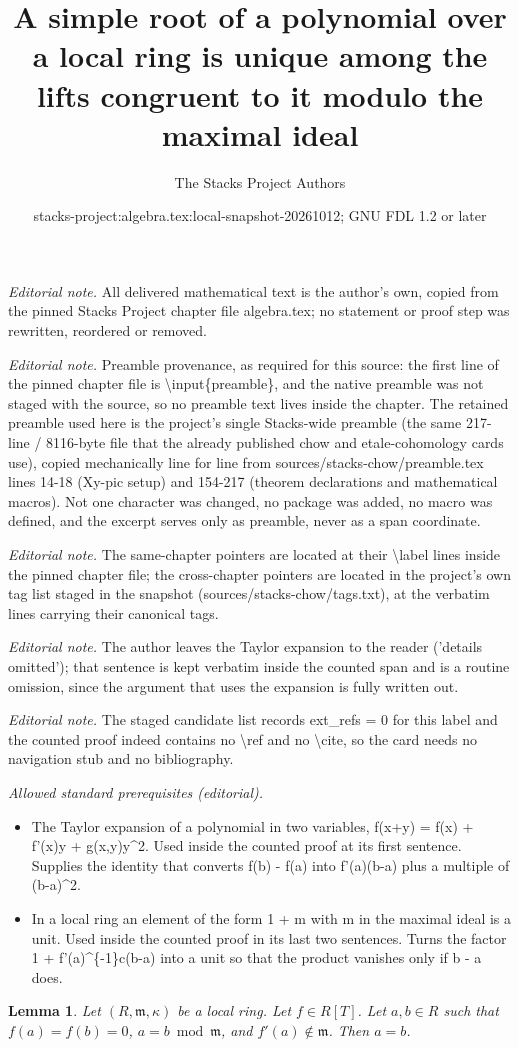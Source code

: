 \documentclass[10pt,a4paper]{amsart}
\title{A simple root of a polynomial over a local ring is unique among the lifts congruent to it modulo the maximal ideal}
\author{The Stacks Project Authors}
\date{stacks-project:algebra.tex:local-snapshot-20261012; GNU FDL 1.2 or later}
\theoremstyle{plain}
\newtheorem{lemma}[subsection]{Lemma}
\theoremstyle{definition}
\theoremstyle{remark}
\numberwithin{equation}{subsection}
\begin{document}
\maketitle
\noindent\textit{Editorial note.} All delivered mathematical text is the author's own, copied from the pinned Stacks Project chapter file algebra.tex; no statement or proof step was rewritten, reordered or removed.\par\medskip
\noindent\textit{Editorial note.} Preamble provenance, as required for this source: the first line of the pinned chapter file is \textbackslash{}input\{preamble\}, and the native preamble was not staged with the source, so no preamble text lives inside the chapter. The retained preamble used here is the project's single Stacks-wide preamble (the same 217-line / 8116-byte file that the already published chow and etale-cohomology cards use), copied mechanically line for line from sources/stacks-chow/preamble.tex lines 14-18 (Xy-pic setup) and 154-217 (theorem declarations and mathematical macros). Not one character was changed, no package was added, no macro was defined, and the excerpt serves only as preamble, never as a span coordinate.\par\medskip
\noindent\textit{Editorial note.} The same-chapter pointers are located at their \textbackslash{}label lines inside the pinned chapter file; the cross-chapter pointers are located in the project's own tag list staged in the snapshot (sources/stacks-chow/tags.txt), at the verbatim lines carrying their canonical tags.\par\medskip
\noindent\textit{Editorial note.} The author leaves the Taylor expansion to the reader ('details omitted'); that sentence is kept verbatim inside the counted span and is a routine omission, since the argument that uses the expansion is fully written out.\par\medskip
\noindent\textit{Editorial note.} The staged candidate list records ext\_refs = 0 for this label and the counted proof indeed contains no \textbackslash{}ref and no \textbackslash{}cite, so the card needs no navigation stub and no bibliography.\par\medskip
\noindent\textit{Allowed standard prerequisites (editorial).}\begin{itemize}
\item The Taylor expansion of a polynomial in two variables, f(x+y) = f(x) + f'(x)y + g(x,y)y\textasciicircum{}2. Used inside the counted proof at its first sentence. Supplies the identity that converts f(b) - f(a) into f'(a)(b-a) plus a multiple of (b-a)\textasciicircum{}2.
\item In a local ring an element of the form 1 + m with m in the maximal ideal is a unit. Used inside the counted proof in its last two sentences. Turns the factor 1 + f'(a)\textasciicircum{}\{-1\}c(b-a) into a unit so that the product vanishes only if b - a does.
\end{itemize}\medskip
\begin{lemma}
\label{lemma-uniqueness}
Let $(R, \mathfrak m, \kappa)$ be a local ring.
Let $f \in R[T]$. Let $a, b \in R$ such that $f(a) = f(b) = 0$,
$a = b \bmod \mathfrak m$, and $f'(a) \not \in \mathfrak m$.
Then $a = b$.
\end{lemma}
\end{document}
